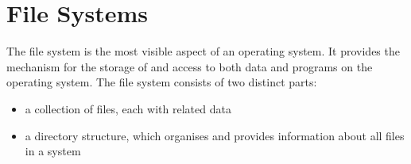 \documentclass{article}
\begin{document}
\section{File Systems}
The file system is the most visible aspect of an operating system. It
provides the mechanism for the storage of and access to both data and
programs on the operating system. The file system consists of two
distinct parts:
\begin{itemize}
    \item a collection of files, each with related data
    \item a directory structure, which organises and provides
    information about all files in a system
\end{itemize}
\end{document}
